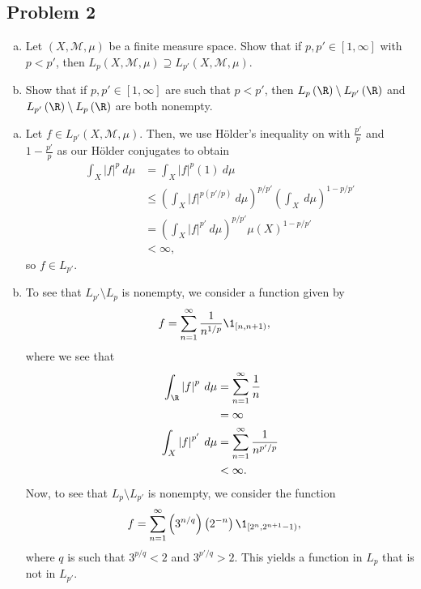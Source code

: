 \documentclass[10pt]{mypackage}
\begin{document}
\subsection{Problem 2}%
\begin{problem}\hfill
  \begin{enumerate}[(a)]
    \item Let $\left( X,\mathcal{M},\mu \right)$ be a finite measure space. Show that if $p,p'\in [1,\infty]$ with $p < p'$, then $L_p\left( X,\mathcal{M},\mu \right) \supseteq L_{p'}\left( X,\mathcal{M},\mu \right)$.
    \item Show that if $p,p'\in [1,\infty]$ are such that $p < p'$, then $L_p\left( \R \right)\setminus L_{p'}\left( \R \right)$ and $L_{p'}\left( \R \right)\setminus L_p\left( \R \right)$ are both nonempty.
  \end{enumerate}
\end{problem}
\begin{enumerate}[(a)]
  \item Let $f\in L_{p'}\left( X,\mathcal{M},\mu \right)$. Then, we use Hölder's inequality on with $\frac{p'}{p}$ and $1-\frac{p'}{p}$ as our Hölder conjugates to obtain
    \begin{align*}
      \int_{X}^{} \left\vert f \right\vert^{p}\:d\mu &= \int_{X}^{} \left\vert f \right\vert^{p}\left( 1 \right)\:d\mu\\
                                                     &\leq \left( \int_{X}^{} \left\vert f \right\vert^{p\left( p'/p \right)}\:d\mu \right)^{p/p'} \left( \int_{X}^{} \:d\mu \right)^{1-p/p'}\\
                                                     &= \left( \int_{X}^{} \left\vert f \right\vert^{p'}\:d\mu \right)^{p/p'}\mu\left( X \right)^{1-p/p'}\\
                                                     &< \infty,
    \end{align*}
    so $f\in L_{p'}$.
  \item To see that $L_{p'}\setminus L_{p}$ is nonempty, we consider a function given by
    \begin{align*}
      f &= \sum_{n=1}^{\infty} \frac{1}{n^{1/p}} \1_{[n,n+1)},
    \end{align*}
    where we see that
    \begin{align*}
      \int_{\R}^{} \left\vert f \right\vert^{p}\:d\mu &= \sum_{n=1}^{\infty}\frac{1}{n}\\
                                                      &= \infty\\
      \int_{X}^{} \left\vert f \right\vert^{p'}\:d\mu &= \sum_{n=1}^{\infty} \frac{1}{n^{p'/p}}\\
                                                      &< \infty.
    \end{align*}
    Now, to see that $L_{p}\setminus L_{p'}$ is nonempty, we consider the function
    \begin{align*}
      f &= \sum_{n=1}^{\infty} \left( 3^{n/q} \right)\left( 2^{-n} \right)\1_{\left[2^{n},2^{n+1}-1\right)},
    \end{align*}
    where $q$ is such that $3^{p/q} < 2$ and $3^{p'/q} > 2$. This yields a function in $L_{p}$ that is not in $L_{p'}$.
\end{enumerate}
\end{document}
